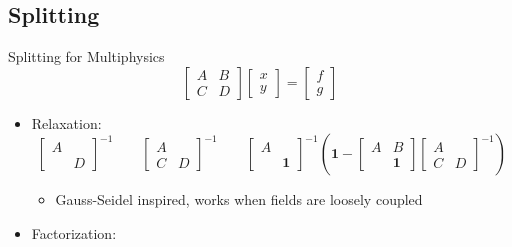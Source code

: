 \subsection{Splitting}
\begin{frame}{Splitting for Multiphysics}
  \begin{equation*}
    \begin{bmatrix}
      A & B \\ C & D
    \end{bmatrix}
    \begin{bmatrix}
      x \\ y
    \end{bmatrix}
    =
    \begin{bmatrix}
      f \\ g
    \end{bmatrix}
  \end{equation*}
  \begin{itemize}\item Relaxation:
    \begin{equation*}
      \begin{bmatrix}
        A & \\  & D
      \end{bmatrix}^{-1} \qquad 
      \begin{bmatrix}
        A & \\ C & D
      \end{bmatrix}^{-1} \qquad
      \begin{bmatrix}
        A & \\  & \bm 1
      \end{bmatrix}^{-1}
      \left(
        \bm 1 -
        \begin{bmatrix}
          A & B \\ & \bm 1
        \end{bmatrix}
        \begin{bmatrix}
          A & \\ C & D
        \end{bmatrix}^{-1}
      \right)
    \end{equation*}
    \begin{itemize}
    \item Gauss-Seidel inspired, works when fields are loosely coupled
    \end{itemize}
  \item Factorization: 
    \begin{align*}

\end{align*}
\end{itemize}
\end{frame}
